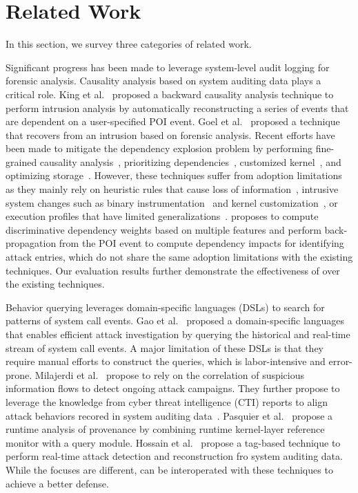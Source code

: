 
\section{Related Work}
\label{sec:literature}

In this section, we survey three categories of related work.


Significant progress has been made to leverage system-level audit logging for forensic analysis.
%
Causality analysis based on system auditing data plays a critical role.
King et al.~\cite{backtracking,backtracking2} proposed a backward causality analysis technique to perform intrusion analysis by automatically reconstructing a series of events that are dependent on a user-specified POI event.
Goel et al.~\cite{taser} proposed a technique that recovers from an intrusion based on forensic analysis.
Recent efforts have been made to mitigate the dependency explosion problem by performing fine-grained causality analysis~\cite{beep,ma2016protracer,mcitracking,ji2017rain,ji2018enabling}, prioritizing dependencies~\cite{liu2018priotracker,hassan2019nodoze}, customized kernel~\cite{trustkernel}, and optimizing storage~\cite{loggc,reduction,reduction2,reduction3}. 
However, these techniques suffer from adoption limitations as they mainly rely on heuristic rules that cause loss of information~\cite{backtracking}, intrusive system changes such as binary instrumentation~\cite{ma2016protracer,mcitracking} and kernel customization~\cite{trustkernel}, or execution profiles that have limited generalizations~\cite{hassan2019nodoze}.
\tool proposes to compute discriminative dependency weights based on multiple features and perform back-propagation from the POI event to compute dependency impacts for identifying attack entries, which do not share the same adoption limitations with the existing techniques. 
Our evaluation results further demonstrate the effectiveness of \tool over the existing techniques.


Behavior querying leverages domain-specific languages (DSLs) to search for patterns of system call events.
Gao et al.~\cite{gao2018aiql,gao2018saql} proposed a domain-specific languages that enables efficient attack investigation by querying the historical and real-time stream of system call events.
A major limitation of these DSLs is that they require manual efforts to construct the queries, which is labor-intensive and error-prone.
Milajerdi et al.~\cite{HOLMES} propose to rely on the correlation of suspicious information flows to detect ongoing attack campaigns.
They further propose to leverage the knowledge from cyber threat intelligence (CTI) reports to align attack behaviors recored in system auditing data~\cite{poirot}. 
Pasquier et al.~\cite{pasquier2018runtime} propose a runtime analysis of provenance by combining runtime kernel-layer reference monitor with a query module. 
Hossain et al.~\cite{sleuth} propose a tag-based technique to perform real-time attack detection and reconstruction fro system auditing data. 
While the focuses are different, \tool can be interoperated with these techniques to achieve a better defense.


